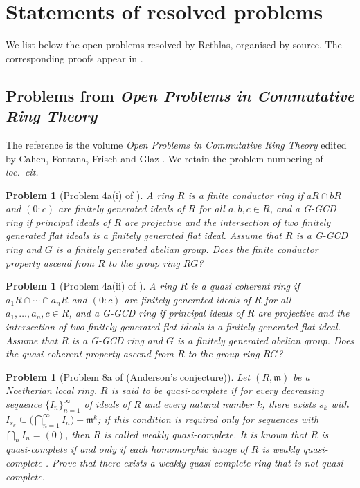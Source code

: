\documentclass[11pt,reqno]{amsart}
\numberwithin{equation}{section}
\newtheorem{problem}[thm]{Problem}
\theoremstyle{definition}
\begin{document}
\section{Statements of resolved problems}\label{sec:statements}

We list below the open problems resolved by Rethlas, organised by source.
The corresponding proofs appear in .

\subsection{Problems from \emph{Open Problems in Commutative Ring Theory}}
\label{subsec:opcrt}

The reference is the volume \emph{Open Problems in Commutative Ring Theory}
edited by Cahen, Fontana, Frisch and Glaz \cite{CFFG2014}. We retain the
problem numbering of \emph{loc.\ cit.}

\begin{problem}[Problem 4a(i) of \cite{CFFG2014}]\label{prob:4ai}
A ring $R$ is a \emph{finite conductor ring} if $aR\cap bR$ and
$(0:c)$ are finitely generated ideals of $R$ for all $a,b,c\in R$, and a
\emph{G-GCD ring} if principal ideals of $R$ are projective and the
intersection of two finitely generated flat ideals is a finitely generated
flat ideal. Assume that $R$ is a G-GCD ring and $G$ is a finitely generated
abelian group. Does the finite conductor property ascend from $R$ to the
group ring $RG$?
\end{problem}

\begin{problem}[Problem 4a(ii) of \cite{CFFG2014}]\label{prob:4aii}
A ring $R$ is a \emph{quasi coherent ring} if
$a_1 R\cap\cdots\cap a_n R$ and $(0:c)$ are finitely generated ideals of $R$
for all $a_1,\dots,a_n,c\in R$, and a \emph{G-GCD ring} if principal ideals
of $R$ are projective and the intersection of two finitely generated flat
ideals is a finitely generated flat ideal. Assume that $R$ is a G-GCD ring
and $G$ is a finitely generated abelian group. Does the quasi coherent
property ascend from $R$ to the group ring $RG$?
\end{problem}

\begin{problem}[Problem 8a of \cite{CFFG2014} (Anderson's conjecture)]\label{prob:8a}
Let $(R,\mathfrak m)$ be a Noetherian local ring. $R$ is said to be
\emph{quasi-complete} if for every decreasing sequence
$\{I_n\}_{n=1}^\infty$ of ideals of $R$ and every natural number $k$,
there exists $s_k$ with
$I_{s_k}\subseteq \bigl(\bigcap_{n=1}^\infty I_n\bigr)+\mathfrak m^k$;
if this condition is required only for sequences with
$\bigcap_n I_n=(0)$, then $R$ is called \emph{weakly quasi-complete}.
It is known that $R$ is quasi-complete if and only if each homomorphic
image of $R$ is weakly quasi-complete \cite{Anderson2014-QCRM}. Prove
that there exists a weakly quasi-complete ring that is not quasi-complete.
\end{problem}
\end{document}
